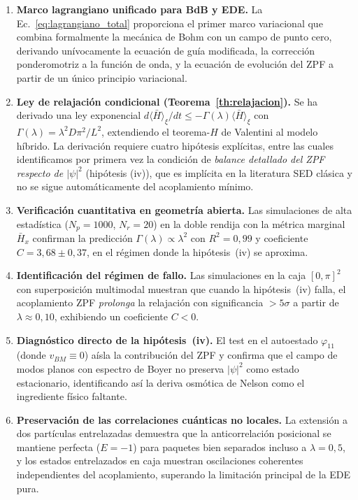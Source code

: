 \documentclass[11pt,a4paper]{article}
\begin{document}
\begin{enumerate}
\item \textbf{Marco lagrangiano unificado para BdB y EDE.}
La Ec.~\eqref{eq:lagrangiano_total} proporciona el primer marco
variacional que combina formalmente la mecánica de Bohm con un campo
de punto cero, derivando unívocamente la ecuación de guía modificada,
la corrección ponderomotriz a la función de onda, y la ecuación de
evolución del ZPF a partir de un único principio variacional.

\item \textbf{Ley de relajación condicional (Teorema~\ref{th:relajacion}).}
Se ha derivado una ley exponencial $d\langle\bar{H}\rangle_\xi/dt\leq
-\Gamma(\lambda)\langle\bar{H}\rangle_\xi$ con
$\Gamma(\lambda)=\lambda^2 D\pi^2/L^2$, extendiendo el teorema-$H$ de
Valentini al modelo híbrido. La derivación requiere cuatro hipótesis
explícitas, entre las cuales identificamos por primera vez la
condición de \emph{balance detallado del ZPF respecto de $|\psi|^2$}
(hipótesis (iv)), que es implícita en la literatura SED clásica y no
se sigue automáticamente del acoplamiento mínimo.

\item \textbf{Verificación cuantitativa en geometría abierta.}
Las simulaciones de alta estadística ($N_p=1000$, $N_r=20$) en la
doble rendija con la métrica marginal $\bar{H}_x$ confirman la
predicción $\Gamma(\lambda)\propto\lambda^2$ con $R^2=0{,}99$ y
coeficiente $C=3{,}68\pm 0{,}37$, en el régimen donde la hipótesis~(iv)
se aproxima.

\item \textbf{Identificación del régimen de fallo.}
Las simulaciones en la caja $[0,\pi]^2$ con superposición multimodal
muestran que cuando la hipótesis~(iv) falla, el acoplamiento ZPF
\emph{prolonga} la relajación con significancia $>5\sigma$ a partir
de $\lambda\approx 0{,}10$, exhibiendo un coeficiente $C<0$.

\item \textbf{Diagnóstico directo de la hipótesis~(iv).}
El test en el autoestado $\varphi_{11}$ (donde $v_{BM}\equiv 0$) aísla
la contribución del ZPF y confirma que el campo de modos planos con
espectro de Boyer no preserva $|\psi|^2$ como estado estacionario,
identificando así la deriva osmótica de Nelson como el ingrediente
físico faltante.

\item \textbf{Preservación de las correlaciones cuánticas no locales.}
La extensión a dos partículas entrelazadas demuestra que la
anticorrelación posicional se mantiene perfecta ($E=-1$) para paquetes
bien separados incluso a $\lambda=0{,}5$, y los estados entrelazados
en caja muestran oscilaciones coherentes independientes del
acoplamiento, superando la limitación principal de la EDE pura.
\end{enumerate}
\end{document}
